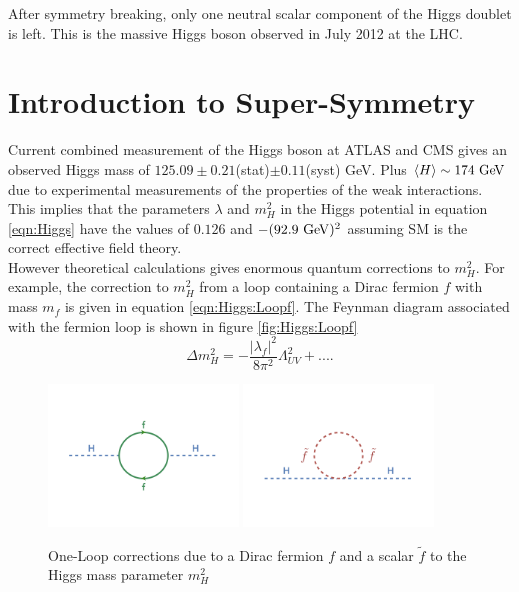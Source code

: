 \indent After symmetry breaking, only one neutral scalar component of the Higgs doublet is left.  This is the massive Higgs boson observed in July 2012 at the LHC.  \\

\section{Introduction to Super-Symmetry}
\label{Theory:QFT}

\indent Current combined measurement of the Higgs boson at ATLAS and CMS gives an observed Higgs mass of $125.09\pm0.21$(stat)$\pm0.11$(syst) GeV.\cite{Higgs2016}  Plus $\braket{H} \sim 174 \gev$ due to experimental measurements of the properties of the weak interactions.  This implies that the parameters $\lambda$ and $m_H^2$ in the Higgs potential in equation \ref{eqn:Higgs} have the values of $0.126$ and $-(92.9 \gev)^2$ assuming SM is the correct effective field theory.  \\

\indent However theoretical calculations gives enormous quantum corrections to $m_H^2$.\cite{MartinSUSY}  For example, the correction to $m_H^2$ from a loop containing a Dirac fermion $f$ with mass $m_f$ is given in equation \ref{eqn:Higgs:Loopf}.  The Feynman diagram associated with the fermion loop is shown in figure \ref{fig:Higgs:Loopf} \\

\begin{equation}
\label{eqn:Higgs:Loopf}
\Delta m_H^2 = - \frac{|\lambda_f|^2}{8\pi^2}\Lambda^2_{UV} + ....
\end{equation}

\begin{figure}[htbp]
	\begin{center}
		\includegraphics[width=0.45\textwidth]{figures/theory/loopf.png}
		\includegraphics[width=0.45\textwidth]{figures/theory/loopS.png}
		\caption{One-Loop corrections due to a Dirac fermion $f$ and a scalar $\tilde{f}$ to the Higgs mass parameter $m_H^2$}
		\label{fig:SM:Loopf}
	\end{center}
\end{figure}


